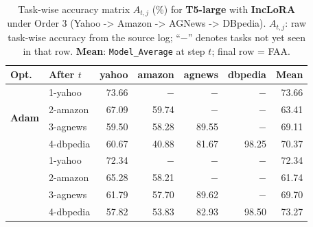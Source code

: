 \begin{table}[ht]
\centering
\caption{%
  Task-wise accuracy matrix $A_{t,j}$ (\%) for \textbf{T5-large} with \textbf{IncLoRA} under Order 3 (Yahoo -> Amazon -> AGNews -> DBpedia).
  $A_{t,j}$: raw task-wise accuracy from the source log; ``$-$'' denotes tasks not yet seen in that row.
  \textbf{Mean}: \texttt{Model\_Average} at step $t$; final row = FAA.
}
\label{tab:nlp_o3_t5large_inclora}
\setlength{\tabcolsep}{4.0pt}
\renewcommand{\arraystretch}{0.92}
\scriptsize
\begin{tabular}{@{}l l r r r r r@{}}
\toprule
\textbf{Opt.} & \textbf{After $t$} & \textbf{yahoo} & \textbf{amazon} & \textbf{agnews} & \textbf{dbpedia} & \textbf{Mean} \\
\midrule
\multirow{4}{*}{\textbf{Adam}} & 1-yahoo & 73.66 & $-$ & $-$ & $-$ & 73.66 \\
 & 2-amazon & 67.09 & 59.74 & $-$ & $-$ & 63.41 \\
 & 3-agnews & 59.50 & 58.28 & 89.55 & $-$ & 69.11 \\
 & 4-dbpedia & 60.67 & 40.88 & 81.67 & 98.25 & 70.37 \\
\addlinespace[2pt]
\multirow{4}{*}{\textbf{SAM}} & 1-yahoo & 72.34 & $-$ & $-$ & $-$ & 72.34 \\
 & 2-amazon & 65.28 & 58.21 & $-$ & $-$ & 61.74 \\
 & 3-agnews & 61.79 & 57.70 & 89.62 & $-$ & 69.70 \\
 & 4-dbpedia & 57.82 & 53.83 & 82.93 & 98.50 & 73.27 \\
\bottomrule
\end{tabular}
\end{table}

